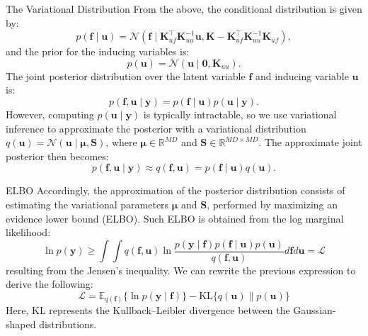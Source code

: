 \documentclass[10pt, xcolor=table]{beamer}
\begin{document}
\begin{frame}{The Variational Distribution}
	From the above, the conditional distribution is given by:
	\begin{equation}
	p(\mathbf{f} \mid \mathbf{u}) = \mathcal{N}\left( \mathbf{f} \mid \mathbf{K}_{uf}^\top \mathbf{K}_{uu}^{-1} \mathbf{u}, \mathbf{K} - \mathbf{K}_{uf}^\top \mathbf{K}_{uu}^{-1} \mathbf{K}_{uf}\right),
	\end{equation}
	and the prior for the inducing variables is:
	\begin{equation}
	p(\mathbf{u}) = \mathcal{N}\left(\mathbf{u} \mid \mathbf{0}, \mathbf{K}_{uu} \right).
	\end{equation}
	The joint posterior distribution over the latent variable $\mathbf{f}$ and inducing variable $\mathbf{u}$ is:
	\begin{equation}
	p(\mathbf{f}, \mathbf{u} \mid \mathbf{y}) = p(\mathbf{f} \mid \mathbf{u}) p(\mathbf{u} \mid \mathbf{y}).
	\end{equation}
	However, computing $p(\mathbf{u} \mid \mathbf{y})$ is typically intractable, so we use variational inference to approximate the posterior with a variational distribution $q(\mathbf{u}) = \mathcal{N}\left( \mathbf{u} \mid \boldsymbol{\mu}, \boldsymbol{S} \right)$, where $\boldsymbol{\mu} \in \mathbb{R}^{MD}$ and $\boldsymbol{S} \in \mathbb{R}^{MD \times MD}$. The approximate joint posterior then becomes:
	\begin{equation}\label{eq:so_join_posterior}
	p(\mathbf{f}, \mathbf{u} \mid \mathbf{y}) \approx q(\mathbf{f}, \mathbf{u}) = p(\mathbf{f} \mid \mathbf{u}) q(\mathbf{u}).
	\end{equation}
	
\end{frame}

\begin{frame}{ELBO}
	Accordingly, the approximation of the posterior distribution consists of estimating the variational parameters $\boldsymbol{\mu}$ and $\boldsymbol{S}$, performed by maximizing an evidence lower bound (ELBO). Such ELBO is obtained from the log marginal likelihood:
	\begin{equation}
	\ln p(\mathbf{y}) \geq \int \int q(\mathbf{f}, \mathbf{u}) \ln \frac{p(\mathbf{y} \mid \mathbf{f}) p(\mathbf{f}\mid \mathbf{u}) p(\mathbf{u})}{q(\mathbf{f}, \mathbf{u})} d\mathbf{f} d\mathbf{u} = \mathcal{L}
	\end{equation}
	resulting from the Jensen's inequality. We can rewrite the previous expression to derive the following:
	\begin{equation}
	\mathcal{L} = \mathbb{E}_{q(\mathbf{f})}\{\ln p(\mathbf{y} \mid \mathbf{f})\} - \text{KL}\{q(\mathbf{u})\parallel p(\mathbf{u})\}
	\end{equation}
	Here, $\text{KL}$ represents the Kullback--Leibler divergence between the Gaussian-shaped distributions.
\end{frame}
\end{document}
